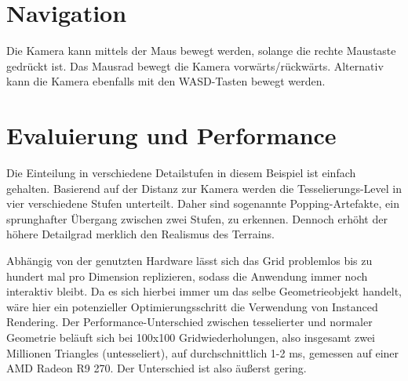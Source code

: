 \documentclass[a4paper,10pt]{article}
\begin{document}
\section*{Navigation}
Die Kamera kann mittels der Maus bewegt werden, solange die rechte Maustaste gedrückt ist. Das Mausrad bewegt die Kamera vorwärts/rückwärts. Alternativ kann die Kamera ebenfalls mit den WASD-Tasten bewegt werden.

\section*{Evaluierung und Performance}
Die Einteilung in verschiedene Detailstufen in diesem Beispiel ist einfach gehalten.  Basierend auf der Distanz zur Kamera werden die Tesselierungs-Level in vier verschiedene Stufen unterteilt. Daher sind sogenannte Popping-Artefakte, ein sprunghafter Übergang zwischen zwei Stufen, zu erkennen. Dennoch erhöht der höhere Detailgrad merklich den Realismus des Terrains. 

Abhängig von der genutzten Hardware lässt sich das Grid problemlos bis zu hundert mal pro Dimension replizieren, sodass die Anwendung immer noch interaktiv bleibt. Da es sich hierbei immer um das selbe Geometrieobjekt handelt, wäre hier ein potenzieller Optimierungsschritt die Verwendung von Instanced Rendering. 
Der Performance-Unterschied zwischen tesselierter und normaler Geometrie beläuft sich bei 100x100 Gridwiederholungen, also insgesamt zwei Millionen Triangles (untesseliert), auf durchschnittlich 1-2 ms, gemessen auf einer AMD Radeon R9 270. Der Unterschied ist also äußerst gering. 



\end{document}
